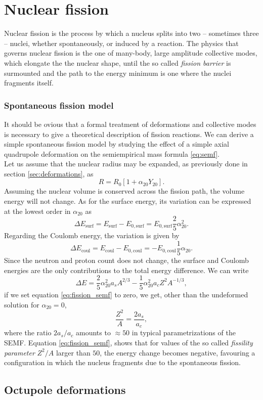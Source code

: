 \section{Nuclear fission}
\label{sec:fission}
Nuclear fission is the process by which a nucleus splits into two -- sometimes three -- nuclei, whether spontaneously, or induced by a reaction.
The physics that governs nuclear fission is the one of many-body, large amplitude collective modes, which elongate the the nuclear shape, until the so called \textit{fission barrier} is surmounted and the path to the energy minimum is one where the nuclei fragments itself.
\subsubsection{Spontaneous fission model}
It should be ovious that a formal treatment of deformations and collective modes is necessary to give a theoretical description of fission reactions. We can derive a simple spontaneous fission model by studying the effect of a simple axial quadrupole deformation on the semiempirical mass formula \ref{eq:semf}.
\\Let us assume that the nuclear radius may be expanded, as previously done in section \ref{sec:deformations}, as
\begin{equation}
    R = R_0[1+\alpha_{20}Y_{20}].
\end{equation}
Assuming the nuclear volume is conserved across the fission path, the volume energy will not change. As for the surface energy, its variation can be expressed at the lowest order in $\alpha_{20}$ as
\begin{equation}
    \Delta E_\text{surf} = E_\text{surf}
    -E_{0,\text{surf}} = E_{0, \text{surf}}\frac 2 5 \alpha_{20}^2.
\end{equation}
Regarding the Coulomb energy, the variation is given by
\begin{equation}
    \Delta E_\text{coul} = E_\text{coul} - E_{0, \text{coul}} = -E_{0, \text{coul}}\frac 1 5 \alpha_{20}.
\end{equation}
Since the neutron and proton count does not change, the surface and Coulomb energies are the only contributions to the total energy difference. We can write
\begin{equation}
    \label{eq:fission_semf}
    \Delta E = \frac 2 5 \alpha_{20}^2 a_s A^{2/3}- \frac 1 5 \alpha_{20}^2 a_c Z^2 A^{-1/3},
\end{equation}
if we set equation \eqref{eq:fission_semf} to zero, we get, other than the undeformed solution for $\alpha_{20}=0$, 
\begin{equation}
    \frac{ Z^2}{A} = \frac{2 a_s}{a_c},
\end{equation}
where the ratio $2a_s/a_c$ amounts to $\approx 50$ in typical parametrizations of the SEMF. Equation \eqref{eq:fission_semf}, shows that for values of the so called \textit{fissility parameter} $Z^2/A$ larger than $50$, the energy change becomes negative, favouring a configuration in which the nucleus fragments due to the spontaneous fission.
\subsection{Octupole deformations}
